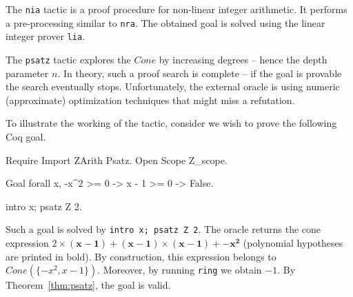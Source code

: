 \label{sec:nia}
The {\tt nia} tactic is a proof procedure for non-linear  integer arithmetic.
%
It performs a pre-processing similar to {\tt nra}. The obtained goal is solved using the linear integer prover {\tt lia}.

\label{sec:psatz}
The {\tt psatz} tactic explores the $\mathit{Cone}$ by increasing degrees -- hence the depth parameter $n$.
In theory, such a proof search is complete -- if the goal is provable the search eventually stops.
Unfortunately, the external oracle is using numeric (approximate) optimization techniques that might miss a
refutation. 

To illustrate the working of the tactic, consider we wish to prove the following Coq goal.
\begin{coq_eval}
Require Import ZArith Psatz.
Open Scope Z_scope.
\end{coq_eval}
\begin{coq_example*}
Goal forall x, -x^2 >= 0 -> x - 1 >= 0 -> False.
\end{coq_example*}
\begin{coq_eval}
intro x; psatz Z 2.
\end{coq_eval}
Such a goal is solved by {\tt intro x; psatz Z 2}. The oracle returns the
cone expression $2 \times (\mathbf{x-1}) + (\mathbf{x-1}) \times
(\mathbf{x-1}) + \mathbf{-x^2}$ (polynomial hypotheses are printed in
bold). By construction, this expression belongs to $\mathit{Cone}(\{-x^2,
x -1\})$. Moreover, by running {\tt ring} we obtain $-1$. By
Theorem~\ref{thm:psatz}, the goal is valid.
%

%



